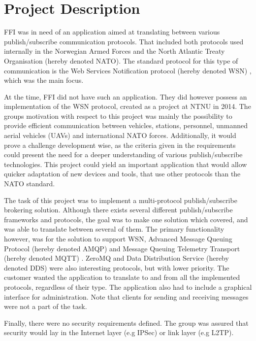 \section{Project Description}
\label{sec:introduction-project_description}

FFI was in need of an application aimed at translating between various publish/subscribe communication protocols. That included both protocols used internally in the Norwegian Armed Forces and the North Atlantic Treaty Organisation (hereby denoted NATO). The standard protocol for this type of communication is the Web Services Notification protocol (hereby denoted WSN) \cite{wsn-complete}, which was the main focus.

At the time, FFI did not have such an application. They did however possess an implementation of the WSN protocol, created as a project at NTNU in 2014. The groups motivation with respect to this project was mainly the possibility to provide efficient communication between vehicles, stations, personnel, unmanned aerial vehicles (UAVs) and international NATO forces. Additionally, it would prove a challenge development wise, as the criteria given in the requirements could present the need for a  deeper understanding of various publish/subscribe technologies. This project could yield an important application that would allow quicker adaptation of new devices and tools, that use other protocols than the NATO standard.

The task of this project was to implement a multi-protocol publish/subscribe brokering solution. Although there exists several different publish/subscribe frameworks and protocols, the goal was to make one solution which covered, and was able to translate between several of them. The primary functionality however, was for the solution to support WSN, Advanced Message Queuing Protocol (hereby denoted AMQP) \cite{amqp} and Message Queuing Telemetry Transport (hereby denoted MQTT) \cite{mqtt}. ZeroMQ \cite{zero-mq} and Data Distribution Service (hereby denoted DDS) \cite{dds} were also interesting protocols, but with lower priority. The customer wanted the application to translate to and from all the implemented protocols, regardless of their type. The application also had to include a graphical interface for administration. Note that clients for sending and receiving messages were not a part of the task.

Finally, there were no security requirements defined. The group was assured that security would lay in the Internet layer (e.g IPSec) or link layer (e.g L2TP).


